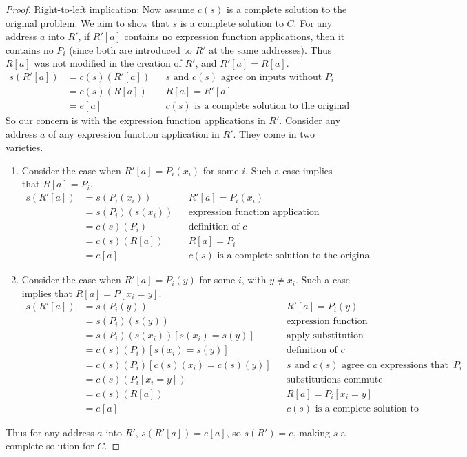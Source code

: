 \documentclass{article}
\begin{document}
\begin{proof}
Right-to-left implication:  Now assume $c(s)$ is a complete solution to the original problem.  We aim to show that $s$ is a complete solution to $C$.  For any address $a$ into $R'$, if $R'[a]$ contains no expression function applications, then it contains no $P_i$ (since both are introduced to $R'$ at the same addresses).  Thus $R[a]$ was not modified in the creation of $R'$, and $R'[a]=R[a]$.
	\begin{align*}
		s(R'[a])	&=	c(s)(R'[a])		&&	\text{$s$ and $c(s)$ agree on inputs without $P_i$}	\\
					&=	c(s)(R[a])		&&	\text{$R[a]=R'[a]$}	\\
					&=	e[a]			&&	\text{$c(s)$ is a complete solution to the original problem}
	\end{align*}
So our concern is with the expression function applications in $R'$.  Consider any address $a$ of any expression function application in $R'$.  They come in two varieties.
\begin{enumerate}
\item	Consider the case when $R'[a]=P_i(x_i)$ for some $i$.  Such a case implies that $R[a]=P_i$.
		\begin{align*}
			s(R'[a])	&=	s(P_i(x_i))			&&	\text{$R'[a]=P_i(x_i)$}	\\
						&=	s(P_i)(s(x_i))		&&	\text{expression function application structure}	\\
						&=	c(s)(P_i)			&&	\text{definition of $c$}	\\
						&=	c(s)(R[a])			&&	\text{$R[a]=P_i$}	\\
						&=	e[a]				&&	\text{$c(s)$ is a complete solution to the original problem}
		\end{align*}
\item	Consider the case when $R'[a]=P_i(y)$ for some $i$, with $y\neq x_i$.  Such a case implies that $R[a]=P[x_i=y]$.
		\begin{align*}
			s(R'[a])	&=	s(P_i(y))							&&	\text{$R'[a]=P_i(y)$}	\\
						&=	s(P_i)(s(y))						&&	\text{expression function application structure}	\\
						&=	s(P_i)(s(x_i))[s(x_i)=s(y)]			&&	\text{apply substitution}	\\
						&=	c(s)(P_i)[s(x_i)=s(y)]				&&	\text{definition of $c$}	\\
						&=	c(s)(P_i)[c(s)(x_i)=c(s)(y)]		&&	\text{$s$ and $c(s)$ agree on expressions that contain no $P_i$}	\\
						&=	c(s)(P_i[x_i=y])					&&	\text{substitutions commute}	\\
						&=	c(s)(R[a])							&&	\text{$R[a]=P_i[x_i=y]$}	\\
						&=	e[a]								&&	\text{$c(s)$ is a complete solution to the original problem}
		\end{align*}
\end{enumerate}
Thus for any address $a$ into $R'$, $s(R'[a])=e[a]$, so $s(R')=e$, making $s$ a complete solution for $C$.
\end{proof}
\end{document}
